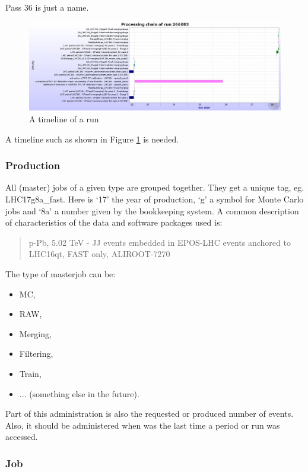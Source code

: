 Pass 36 is just a name. 

\begin{figure}[h]
  \begin{center}
    \includegraphics[scale=0.25]{./images/timeline.png}
    \caption{A timeline of a run}
    \label{fig:timeline}
  \end{center}
\end{figure}

A timeline such as shown in Figure \ref{fig:timeline} is needed.

\subsubsection{Production}
All (master) jobs of a given type are grouped together. They get a unique tag, eg. LHC17g8a\_fast. Here is `17' the year of production, `g' a symbol for Monte Carlo jobs and `8a' a number given by the bookkeeping system. A common description of characteristics of the data and software packages used is:
\begin{quotation}
p-Pb, 5.02 TeV - JJ events embedded in EPOS-LHC events anchored to LHC16qt, FAST only, ALIROOT-7270
\end{quotation}
The type of masterjob can be:
\begin{itemize}
  \item MC,
  \item RAW, 
  \item Merging, 
  \item Filtering, 
  \item Train, 
  \item ... (something else in the future).
\end{itemize}
Part of this administration is also the requested or produced number of events. Also, it should be administered when was the last time a period or run was accessed.

\subsubsection{Job}

